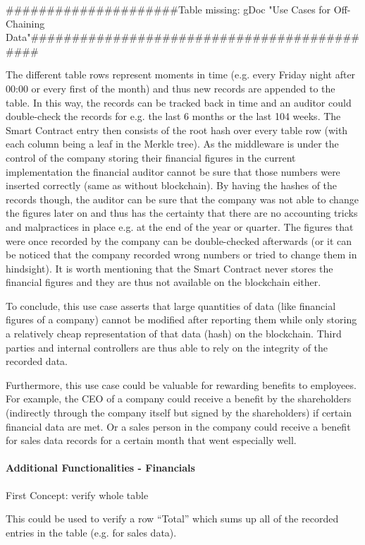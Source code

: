 #####################Table missing: gDoc "Use Cases for Off-Chaining Data"############################################

The different table rows represent moments in time (e.g. every Friday night after 00:00 or every first of the month) and thus new records are appended to the table. In this way, the records can be tracked back in time and an auditor could double-check the records for e.g. the last 6 months or the last 104 weeks. The Smart Contract entry then consists of the root hash over every table row (with each column being a leaf in the Merkle tree).
As the middleware is under the control of the company storing their financial figures in the current implementation the financial auditor cannot be sure that those numbers were inserted correctly (same as without blockchain). By having the hashes of the records though, the auditor can be sure that the company was not able to change the figures later on and thus has the certainty that there are no accounting tricks and malpractices in place e.g. at the end of the year or quarter. The figures that were once recorded by the company can be double-checked afterwards (or it can be noticed that the company recorded wrong numbers or tried to change them in hindsight). It is worth mentioning that the Smart Contract never stores the financial figures and they are thus not available on the blockchain either.

To conclude, this use case asserts that large quantities of data (like financial figures of a company) cannot be modified after reporting them while only storing a relatively cheap representation of that data (hash) on the blockchain. Third parties and internal controllers are thus able to rely on the integrity of the recorded data.

Furthermore, this use case could be valuable for rewarding benefits to employees. For example, the CEO of a company could receive a benefit by the shareholders (indirectly through the company itself but signed by the shareholders) if certain financial data are met. Or a sales person in the company could receive a benefit for sales data records for a certain month that went especially well.

\paragraph{Additional Functionalities - Financials}
First Concept: verify whole table

This could be used to verify a row “Total” which sums up all of the recorded entries in the table (e.g. for sales data).

